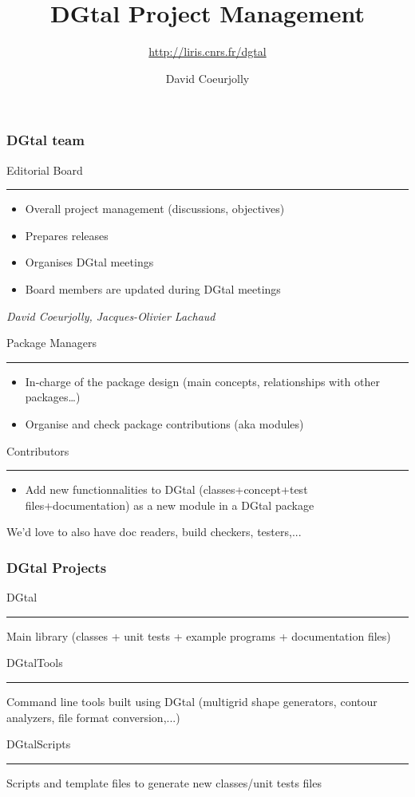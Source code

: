 \documentclass[8pt]{beamer}
\title[DGtal Meeting 2012]{DGtal Project Management}
\subtitle{\url{http://liris.cnrs.fr/dgtal}}
\author[D. Coeurjolly]{David Coeurjolly}
\newcommand{\HH}{ \vspace{0.5pt}\hrule}
\begin{document}
\small






\begin{frame}[plain]
  \titlepage
\end{frame}


\begin{frame}
  \frametitle{DGtal team}
\small
  \begin{block}{Editorial Board\HH}
    \begin{itemize}
    \item Overall project management (discussions, objectives)
    \item  Prepares releases
    \item Organises DGtal meetings
      \item Board members are updated during DGtal meetings 
    \end{itemize}
 \emph{David Coeurjolly, Jacques-Olivier Lachaud}
  \end{block}

  \begin{block}{Package Managers\HH}
    \begin{itemize}
    \item In-charge of the package design (main concepts,
      relationships with other packages\ldots)
    \item Organise and check  package contributions (aka modules)
    \end{itemize}
  \end{block}

 \begin{block}{Contributors\HH}
    \begin{itemize}
    \item Add new functionnalities to DGtal (classes+concept+test
      files+documentation) as a new module in a DGtal package
    \end{itemize}
  \end{block}

We'd love to also have doc readers, build checkers, testers,...
\end{frame}


\begin{frame}
  \frametitle{DGtal Projects}

  \begin{block}{DGtal\HH}
    Main library (classes + unit tests + example programs + documentation files)
  \end{block}

\vspace{0.5cm}

  \begin{block}{DGtalTools\HH}
   Command line tools built using DGtal (multigrid shape generators,
   contour analyzers, file format conversion,...)
  \end{block}

\vspace{0.5cm}

  \begin{block}{DGtalScripts\HH}
    Scripts and template files to generate new classes/unit tests files
  \end{block}
\end{frame}
\end{document}
